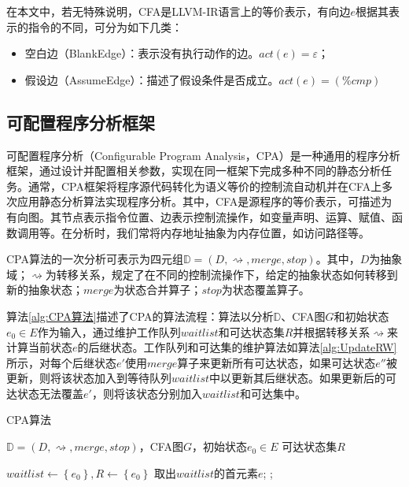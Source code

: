 在本文中，若无特殊说明，CFA是LLVM-IR语言上的等价表示，有向边$ e $根据其表示的指令的不同，可分为如下几类：
\begin{itemize}
	\item 空白边（BlankEdge）：表示没有执行动作的边。$ act(e) = \varepsilon $；
	\item 假设边（AssumeEdge）：描述了假设条件是否成立。$ act(e) = (\%cmp) $
\end{itemize}

\subsection{可配置程序分析框架} 

可配置程序分析（Configurable Program Analysis，CPA）是一种通用的程序分析框架，通过设计并配置相关参数，实现在同一框架下完成多种不同的静态分析任务。通常，CPA框架将程序源代码转化为语义等价的控制流自动机并在CFA上多次应用静态分析算法实现程序分析。其中，CFA是源程序的等价表示，可描述为有向图。其节点表示指令位置、边表示控制流操作，如变量声明、运算、赋值、函数调用等。在分析时，我们常将内存地址抽象为内存位置，如访问路径\cite{cheng2000modular}等。

CPA算法的一次分析可表示为四元组$ \mathbb{D} = (D, \rightsquigarrow, merge, stop) $。其中，$ D $为抽象域；$ \rightsquigarrow $为转移关系，规定了在不同的控制流操作下，给定的抽象状态如何转移到新的抽象状态；$ merge $为状态合并算子；$ stop $为状态覆盖算子。

算法\ref{alg:CPA算法}描述了CPA的算法流程：算法以分析$ \mathbb{D}$、CFA图$ G $和初始状态$ e_0 \in E $作为输入，通过维护工作队列$ waitlist $和可达状态集$ R $并根据转移关系$ \rightsquigarrow $来计算当前状态$ e $的后继状态。工作队列和可达集的维护算法如算法\ref{alg:UpdateRW}所示，对每个后继状态$ e' $使用$ merge $算子来更新所有可达状态，如果可达状态$ e'' $被更新，则将该状态加入到等待队列$ waitlist $中以更新其后继状态。如果更新后的可达状态无法覆盖$ e' $，则将该状态分别加入$ waitlist $和可达集中。

\begin{algorithm}[H]
	\caption{CPA算法}
	\label{alg:CPA算法}
	\begin{algorithmic}[1]
		
		\Require $ \mathbb{D} = (D, \rightsquigarrow, merge, stop) $，CFA图$ G $，初始状态$ e_0 \in E $
		\Ensure 可达状态集$ R $
		
		\State $ waitlist \gets \left\{ e_0 \right\} , R \gets \left\{ e_0 \right\}$
			\State 取出$ waitlist $的首元素$ e $;
				\State {};
			\EndFor
		\EndWhile
		
	\end{algorithmic}
\end{algorithm}

